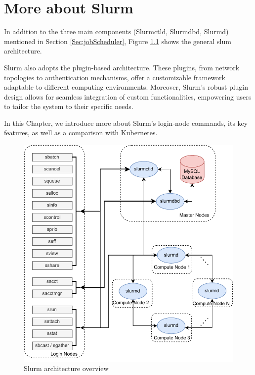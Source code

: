 \chapter{More about Slurm}

In addition to the three main components (Slurmctld, Slurmdbd, Slurmd) mentioned in Section \ref{Sec:jobScheduler}, Figure \ref{fig_slurm_overview} shows the general slum architecture.

Slurm also adopts the plugin-based architecture. These plugins, from network topologies to authentication mechanisms, offer a customizable framework adaptable to different computing environments. Moreover, Slurm's robust plugin design allows for seamless integration of custom functionalities, empowering users to tailor the system to their specific needs.

In this Chapter, we introduce more about Slurm's login-node commands, its key features, as well as a comparison with Kubernetes.

\begin{figure}[tb]
    \centering
    \includegraphics[width=1\textwidth]{figures/slurm-overview.pdf}
    \caption{Slurm architecture overview}
    \label{fig_slurm_overview}
\end{figure}



